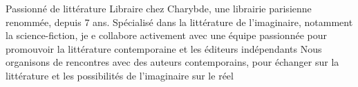 

\begin{cvskills}


  \cvskill
    {Passionné de littérature} %
    {Libraire chez Charybde, une librairie parisienne renommée, depuis 7 ans. \newline Spécialisé dans la littérature de l'imaginaire, notamment la science-fiction, \newline je e collabore  activement avec une équipe passionnée pour promouvoir la littérature contemporaine et les éditeurs indépendants \newline Nous organisons de rencontres avec des auteurs contemporains, pour échanger sur la littérature et les possibilités de l'imaginaire sur le réel} %

\end{cvskills}
